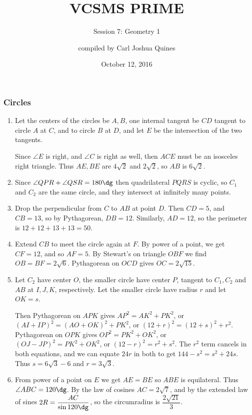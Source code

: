 \documentclass[10pt,paper=letter]{scrartcl}
\begin{document}
\title{VCSMS PRIME}
\subtitle{Session 7: Geometry 1}
\author{compiled by Carl Joshua Quines}
\date{October 12, 2016}

\maketitle

\subsubsection*{Circles}

\begin{enumerate}

\item Let the centers of the circles be $A, B$, one internal tangent be $CD$ tangent to circle $A$ at $C$, and to circle $B$ at $D$, and let $E$ be the intersection of the two tangents. 

Since $\angle E$ is right, and $\angle C$ is right as well, then $ACE$ must be an isosceles right triangle. Thus $AE, BE$ are $4\sqrt2$ and $2\sqrt2$, so $AB$ is $6\sqrt2$.

\item Since $\angle QPR + \angle QSR = 180\dg$ then quadrilateral $PQRS$ is cyclic, so $C_1$ and $C_2$ are the same circle, and they intersect at infinitely many points. 

\item Drop the perpendicular from $C$ to $AB$ at point $D$. Then $CD = 5$, and $CB = 13$, so by Pythagorean, $DB = 12$. Similarly, $AD = 12$, so the perimeter is $12 + 12 +13 + 13 = 50$.

\item Extend $CB$ to meet the circle again at $F$. By power of a point, we get $CF = 12$, and so $AF = 5$. By Stewart's on triangle $OBF$ we find $OB = BF = 2\sqrt6$. Pythagorean on $OCD$ gives $OC = 2\sqrt{15}$.

\item Let $C_2$ have center $O$, the smaller circle have center $P$, tangent to $C_1, C_2$ and $AB$ at $I, J, K$, respectively. Let the smaller circle have radius $r$ and let $OK = s$.

Then Pythagorean on $APK$ gives $AP^2 = AK^2 + PK^2$, or $(AI + IP)^2 = (AO + OK)^2 + PK^2$, or $(12 + r)^2 = (12 + s)^2 + r^2$. Pythagorean on $OPK$ gives $OP^2 = PK^2 + OK^2$, or $(OJ - JP)^2 = PK^2 + OK^2$, or $(12 - r)^2 = r^2 + s^2$. The $r^2$ term cancels in both equations, and we can equate $24r$ in both to get $144 - s^2 = s^2 + 24s$. Thus $s = 6\sqrt3 - 6$ and $r = 3\sqrt3$.

\item From power of a point on $E$ we get $AE = BE$ so $ABE$ is equilateral. Thus $\angle ABC = 120\dg$. By the law of cosines $AC = 2\sqrt7$, and by the extended law of sines $2R = \dfrac{AC}{\sin120\dg}$, so the circumradius is $\dfrac{2\sqrt{21}}3$.

\end{enumerate}
\end{document}
